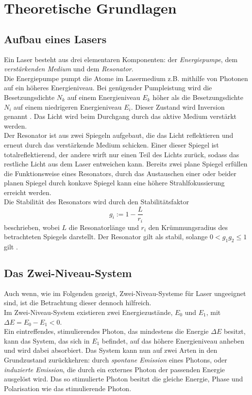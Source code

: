 \section{Theoretische Grundlagen}
\label{sec:theorie}

\subsection{Aufbau eines Lasers}

Ein Laser besteht aus drei elementaren Komponenten: der \textit{Energiepumpe}, dem \textit{verstärkenden Medium} und dem \textit{Resonator}. \\
Die Energiepumpe pumpt die Atome im Lasermedium z.B. mithilfe von Photonen auf ein höheres Energieniveau. 
Bei genügender Pumpleistung wird die Besetzungsdichte $N_k$ auf einem Energieniveau $E_k$ höher als die Besetzungsdichte $N_i$ auf einem niedrigeren Energieniveau $E_i$.
Dieser Zustand wird Inversion genannt \cite{dem01}.
Das Licht wird beim Durchgang durch das aktive Medium verstärkt werden. \\

Der Resonator ist aus zwei Spiegeln aufgebaut, die das Licht reflektieren und erneut durch das verstärkende Medium schicken.
Einer dieser Spiegel ist totalreflektierend, der andere wirft nur einen Teil des Lichts zurück, sodass das restliche Licht aus dem Laser entweichen kann.
Bereits zwei plane Spiegel erfüllen die Funktionsweise eines Resonators, durch das Austauschen einer oder beider planen Spiegel durch konkave Spiegel kann eine höhere Strahlfokussierung erreicht werden. \\
Die Stabilität des Resonators wird durch den Stabilitätsfaktor
\begin{equation}
    g_i := 1 - \frac{L}{r_i} 
\end{equation}
beschrieben, wobei $L$ die Resonatorlänge und $r_i$ den Krümmungsradius des betrachteten Spiegels darstellt.
Der Resonator gilt als stabil, solange $0 < g_1 g_2 \leq 1$ gilt \cite{dem01}.

\subsection{Das Zwei-Niveau-System}
\label{subsec:2nivsys}

Auch wenn, wie im Folgenden gezeigt, Zwei-Niveau-Systeme für Laser ungeeignet sind, ist die Betrachtung dieser dennoch hilfreich. \\
Im Zwei-Niveau-System existieren zwei Energiezustände, $E_0$ und $E_1$, mit $\Delta E = E_0 - E_1 < 0$. \\
Ein eintreffendes, stimulierendes Photon, das mindestens die Energie $\Delta E$ besitzt, kann das System, das sich in $E_1$ befindet, auf das höhere Energieniveau anheben und wird dabei absorbiert.
Das System kann nun auf zwei Arten in den Grundzustand zurückkehren: durch \textit{spontane Emission} eines Photons, oder \textit{induzierte Emission}, die durch ein externes Photon der passenden Energie ausgelöst wird.
Das so stimulierte Photon besitzt die gleiche Energie, Phase und Polarisation wie das stimulierende Photon. \\

